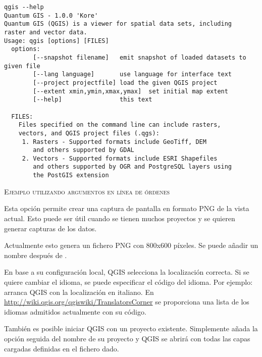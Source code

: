 \small
\begin{verbatim}
qgis --help
Quantum GIS - 1.0.0 'Kore'
Quantum GIS (QGIS) is a viewer for spatial data sets, including
raster and vector data.
Usage: qgis [options] [FILES]
  options:
        [--snapshot filename]   emit snapshot of loaded datasets to given file
        [--lang language]       use language for interface text
        [--project projectfile] load the given QGIS project
        [--extent xmin,ymin,xmax,ymax]  set initial map extent
        [--help]                this text

  FILES:
    Files specified on the command line can include rasters,
    vectors, and QGIS project files (.qgs):
     1. Rasters - Supported formats include GeoTiff, DEM
        and others supported by GDAL
     2. Vectors - Supported formats include ESRI Shapefiles
        and others supported by OGR and PostgreSQL layers using
        the PostGIS extension
\end{verbatim}
\normalsize

\begin{Tip} \caption{\textsc{Ejemplo utilizando argumentos en línea de órdenes}}
\end{Tip}

Esta opción permite crear una captura de pantalla en formato PNG de la vista actual.
Esto puede ser útil cuando se tienen muchos proyectos y se quieren generar capturas de los datos.

Actualmente esto genera un fichero PNG con 800x600 píxeles. Se puede añadir un nombre después de
.

En base a su configuración local, QGIS selecciona la localización correcta. Si se quiere 
cambiar el idioma, se puede especificar el código del idioma. Por ejemplo:
arranca QGIS con la localización en italiano. En \url{http://wiki.qgis.org/qgiswiki/TranslatorsCorner}
se proporciona una lista de los idiomas admitidos actualmente con su código.

También es posible iniciar QGIS con un proyecto existente. Simplemente añada 
la opción  seguida del nombre de su proyecto y QGIS se abrirá 
con todas las capas cargadas definidas en el fichero dado.

